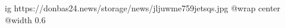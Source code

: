  
 
 
 
 

\ifcmt
  ig https://donbas24.news/storage/news/jljuwme759jetsqs.jpg
  @wrap center
  @width 0.6
\fi
